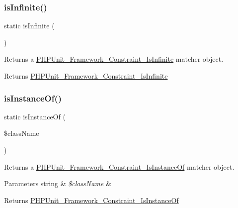 \subsubsection{\texorpdfstring{is\+Infinite()}{isInfinite()}}
{\footnotesize\ttfamily static is\+Infinite (\begin{DoxyParamCaption}{ }\end{DoxyParamCaption})\hspace{0.3cm}{\ttfamily [static]}}

Returns a \mbox{\hyperlink{class_p_h_p_unit___framework___constraint___is_infinite}{P\+H\+P\+Unit\+\_\+\+Framework\+\_\+\+Constraint\+\_\+\+Is\+Infinite}} matcher object.

\begin{DoxyReturn}{Returns}
\mbox{\hyperlink{class_p_h_p_unit___framework___constraint___is_infinite}{P\+H\+P\+Unit\+\_\+\+Framework\+\_\+\+Constraint\+\_\+\+Is\+Infinite}} 
\end{DoxyReturn}
\mbox{\label{class_p_h_p_unit___framework___assert_ac4d2cbeb120f4caea971bcd83b136a59}} 
\subsubsection{\texorpdfstring{is\+Instance\+Of()}{isInstanceOf()}}
{\footnotesize\ttfamily static is\+Instance\+Of (\begin{DoxyParamCaption}\item[{}]{\$class\+Name }\end{DoxyParamCaption})\hspace{0.3cm}{\ttfamily [static]}}

Returns a \mbox{\hyperlink{class_p_h_p_unit___framework___constraint___is_instance_of}{P\+H\+P\+Unit\+\_\+\+Framework\+\_\+\+Constraint\+\_\+\+Is\+Instance\+Of}} matcher object.


\begin{DoxyParams}[1]{Parameters}
string & {\em \$class\+Name} & \\
\hline
\end{DoxyParams}
\begin{DoxyReturn}{Returns}
\mbox{\hyperlink{class_p_h_p_unit___framework___constraint___is_instance_of}{P\+H\+P\+Unit\+\_\+\+Framework\+\_\+\+Constraint\+\_\+\+Is\+Instance\+Of}} 
\end{DoxyReturn}
\mbox{\label{class_p_h_p_unit___framework___assert_a41ac5e3bef6aa36256a212ec69f04905}} 
